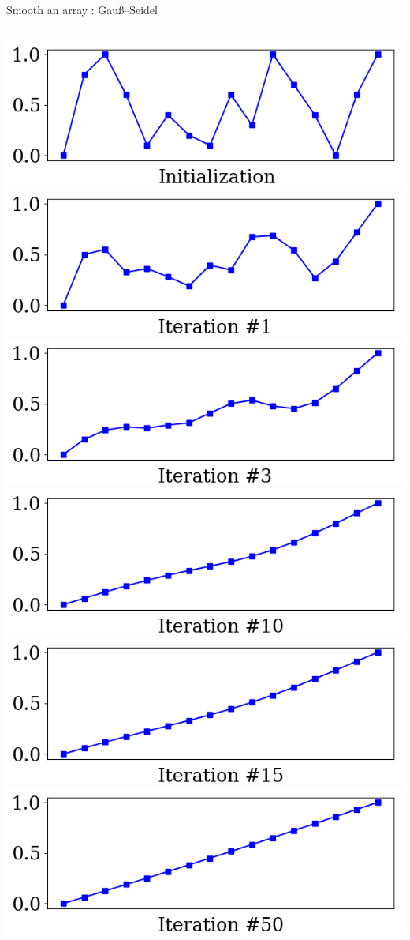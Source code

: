 \documentclass[UKenglish,aspectratio=169]{beamer}
\begin{document}
\begin{frame}[fragile]{Smooth an array : Gauß--Seidel}
\inputminted[frame=single]{python}{listings/example_3.2.py}
\includegraphics[width=.32\linewidth]{../manuscript/img/example_3_2_0.png}
\includegraphics[width=.32\linewidth]{../manuscript/img/example_3_2_1.png}
\includegraphics[width=.32\linewidth]{../manuscript/img/example_3_2_2.png}
\includegraphics[width=.32\linewidth]{../manuscript/img/example_3_2_3.png}
\includegraphics[width=.32\linewidth]{../manuscript/img/example_3_2_4.png}
\includegraphics[width=.32\linewidth]{../manuscript/img/example_3_2_5.png}
\end{frame}
\end{document}
